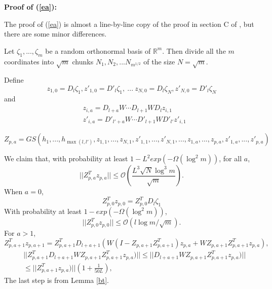 \documentclass{article}
\newcommand{\cO}{\mathcal{O}}
\begin{document}
{\bf Proof of (\ref{ea}): }

The proof of (\ref{ea}) is almost a line-by-line copy of the proof in section C of \cite{allenzhu2019sgd}, but there are some minor differences.

Let $\zeta_1,...,\zeta_m$  be a random orthonormal basis of $\mathbb{R}^m$. Then divide all the $m$ coordinates into $\sqrt{m}$ chunks $N_1, N_2,...N_{m^{1/2}}$ of the size $N=\sqrt{m}$.

Define
\begin{equation}
z_{1,0}=D_l\zeta_1, z'_{1,0}=D'_l\zeta_1,\ ...\ z_{N,0}=D_l\zeta_N, z'_{N,0}=D'_l\zeta_N
\end{equation}
and
\begin{equation}
\begin{aligned}
&z_{i,a}=D_{l+a}W\cdots D_{l+1}WD_lz_{i,1}\\
&z'_{i,a}=D'_{l'+a}W\cdots D'_{l+1}WD'_{l'}z'_{i,1}
\end{aligned}
\end{equation}

\begin{equation}
Z_{p,a}=GS(h_1,..., h_{\max(l,l')},z_{1,1},...,z_{N,1},z'_{1,1},...,z'_{N,1},...,z_{1,a},...,z_{p,a},z'_{1,a},...,z'_{p,a})
\end{equation}

We claim that, with probability at least $1-L^2exp(-\Omega(\log^2m))$, for all $a$,
\begin{equation}
||Z_{p,a}^Tz_{p,a}||\leq \cO(\frac{L^3\sqrt{N}\log^3m}{\sqrt{m}}).
\end{equation}
When $a=0$,
\begin{equation}
Z_{p,0}^Tz_{p,0}=Z_{p,0}^TD_l\zeta_1
\end{equation}
With probability at least $1-exp(-\Omega(\log^2m))$,
\begin{equation}
||Z_{p,0}^Tz_{p,0}||\leq \cO(l\log m/\sqrt{m}).
\end{equation}
 For $a>1$,
\begin{equation}
Z_{p,a+1}^Tz_{p,a+1}=Z_{p,a+1}^TD_{l+a+1}(W(I-Z_{p,a+1}Z_{p,a+1}^T)z_{p,a}+WZ_{p,a+1}Z_{p,a+1}^Tz_{p,a}),
\end{equation}
\begin{equation}
\begin{aligned}
&||Z_{p,a+1}^TD_{l+a+1}WZ_{p,a+1}Z_{p,a+1}^Tz_{p,a})||\leq ||D_{l+a+1}WZ_{p,a+1}Z_{p,a+1}^Tz_{p,a})||\\
&\leq ||Z_{p,a+1}^Tz_{p,a})||(1+\frac{1}{50L}),
\end{aligned}
\end{equation}
The last step is from Lemma \ref{bt}.
\end{document}
